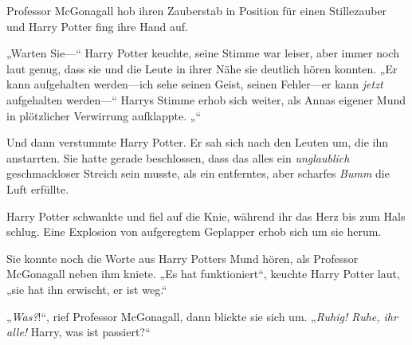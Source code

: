 Professor McGonagall hob ihren Zauberstab in Position für einen Stillezauber und Harry Potter fing ihre Hand auf.

„Warten Sie—“
Harry Potter keuchte, seine Stimme war leiser, aber immer noch laut genug, dass sie und die Leute in ihrer Nähe sie deutlich hören konnten.
„Er kann aufgehalten werden—ich sehe seinen Geist, seinen Fehler—er kann \emph{jetzt} aufgehalten werden—“
Harrys Stimme erhob sich weiter, als Annas eigener Mund in plötzlicher Verwirrung aufklappte.
„“

Und dann verstummte Harry Potter.
Er sah sich nach den Leuten um, die ihn anstarrten. Sie hatte gerade beschlossen, dass das alles ein \emph{unglaublich} geschmackloser Streich sein musste, als ein entferntes, aber scharfes \emph{Bumm} die Luft erfüllte.

Harry Potter schwankte und fiel auf die Knie, während ihr das Herz bis zum Hals schlug. Eine Explosion von aufgeregtem Geplapper erhob sich um sie herum.

Sie konnte noch die Worte aus Harry Potters Mund hören, als Professor McGonagall neben ihm kniete.
„Es hat funktioniert“, keuchte Harry Potter laut, „sie hat ihn erwischt, er ist weg.“

„\emph{Was?}!“, rief Professor McGonagall, dann blickte sie sich um. „\emph{Ruhig! Ruhe, ihr alle!} Harry, was ist passiert?“

